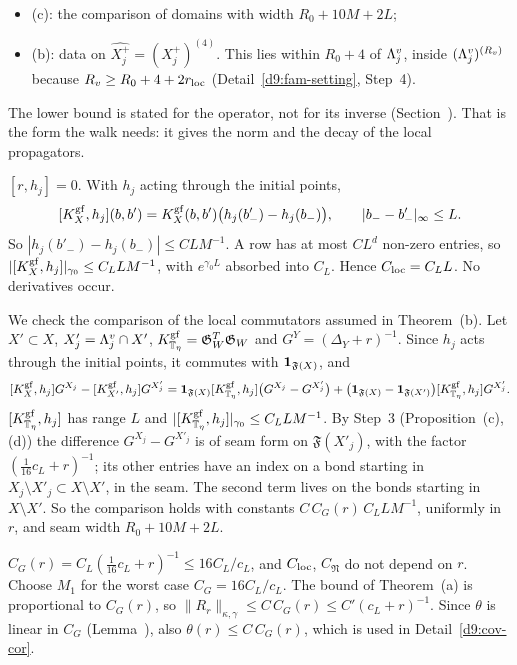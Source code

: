 \begin{detail}
\begin{step}[(W2)]
\begin{itemize}
\item (c): the comparison of domains with width $R_0+10M+2L$;
\item (b): data on $\widehat{X_j^+}=(X_j^+)^{(4)}$. This lies within $R_0+4$ of $\Lambda^v_j$, inside $(\Lambda^v_j)^{(R_v)}$ because $R_v\ge R_0+4+2r_{\rm loc}$ (Detail~\ref{d9:fam-setting}, Step~4).
\end{itemize}
The lower bound is stated for the operator, not for its inverse (Section~). That is the form the walk needs: it gives the norm and the decay of the local propagators.
\end{step}
\begin{step}
$[r,h_j]=0$. With $h_j$ acting through the initial points,
\[
[K^{\rm gf}_X,h_j](b,b')=K^{\rm gf}_X(b,b')\big(h_j(b'_-)-h_j(b_-)\big),\qquad|b_--b'_-|_\infty\le L .
\]
So $|h_j(b'_-)-h_j(b_-)|\le CLM^{-1}$. A row has at most $CL^d$ non-zero entries, so $|[K^{\rm gf}_X,h_j]|_{\gamma_0}\le C_LLM^{-1}$, with $e^{\gamma_0L}$ absorbed into $C_L$. Hence $C_{\rm loc}=C_LL$. No derivatives occur.

We check the comparison of the local commutators assumed in Theorem~(b). Let $X'\subset X$, $X'_j=\Lambda^v_j\cap X'$, $K^{\rm gf}_{\mathbb T_\eta}=\mathfrak G_W^T\mathfrak G_W$ and $G^Y=(\Delta_Y+r)^{-1}$. Since $h_j$ acts through the initial points, it commutes with $\mathbf 1_{\mathfrak F(X)}$, and
\[
[K^{\rm gf}_X,h_j]G^{X_j}-[K^{\rm gf}_{X'},h_j]G^{X'_j}=\mathbf 1_{\mathfrak F(X)}[K^{\rm gf}_{\mathbb T_\eta},h_j]\big(G^{X_j}-G^{X'_j}\big)+\big(\mathbf 1_{\mathfrak F(X)}-\mathbf 1_{\mathfrak F(X')}\big)[K^{\rm gf}_{\mathbb T_\eta},h_j]G^{X'_j} .
\]
$[K^{\rm gf}_{\mathbb T_\eta},h_j]$ has range $L$ and $|[K^{\rm gf}_{\mathbb T_\eta},h_j]|_{\gamma_0}\le C_LLM^{-1}$. By Step~3 (Proposition~(c),(d)) the difference $G^{X_j}-G^{X'_j}$ is of seam form on $\mathfrak F(X'_j)$, with the factor $(\frac1{16}c_L+r)^{-1}$; its other entries have an index on a bond starting in $X_j\setminus X'_j\subset X\setminus X'$, in the seam. The second term lives on the bonds starting in $X\setminus X'$. So the comparison holds with constants $C\,C_G(r)\,C_LLM^{-1}$, uniformly in $r$, and seam width $R_0+10M+2L$.
\end{step}
\begin{step}[Uniformity in $r$]
$C_G(r)=C_L(\frac1{16}c_L+r)^{-1}\le16C_L/c_L$, and $C_{\rm loc}$, $C_{\mathfrak N}$ do not depend on $r$. Choose $M_1$ for the worst case $C_G=16C_L/c_L$. The bound of Theorem~(a) is proportional to $C_G(r)$, so $\|R_r\|_{\kappa,\gamma}\le C\,C_G(r)\le C'(c_L+r)^{-1}$. Since $\theta$ is linear in $C_G$ (Lemma~), also $\theta(r)\le C\,C_G(r)$, which is used in Detail~\ref{d9:cov-cor}.
\end{step}
\end{detail}

